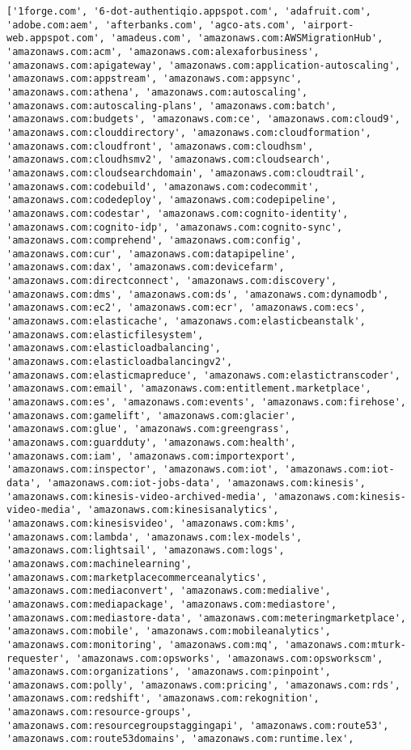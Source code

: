 \documentclass[11pt]{article}
\begin{document}
    \begin{Verbatim}[commandchars=\\\{\}]
['1forge.com', '6-dot-authentiqio.appspot.com', 'adafruit.com', 'adobe.com:aem', 'afterbanks.com', 'agco-ats.com', 'airport-web.appspot.com', 'amadeus.com', 'amazonaws.com:AWSMigrationHub', 'amazonaws.com:acm', 'amazonaws.com:alexaforbusiness', 'amazonaws.com:apigateway', 'amazonaws.com:application-autoscaling', 'amazonaws.com:appstream', 'amazonaws.com:appsync', 'amazonaws.com:athena', 'amazonaws.com:autoscaling', 'amazonaws.com:autoscaling-plans', 'amazonaws.com:batch', 'amazonaws.com:budgets', 'amazonaws.com:ce', 'amazonaws.com:cloud9', 'amazonaws.com:clouddirectory', 'amazonaws.com:cloudformation', 'amazonaws.com:cloudfront', 'amazonaws.com:cloudhsm', 'amazonaws.com:cloudhsmv2', 'amazonaws.com:cloudsearch', 'amazonaws.com:cloudsearchdomain', 'amazonaws.com:cloudtrail', 'amazonaws.com:codebuild', 'amazonaws.com:codecommit', 'amazonaws.com:codedeploy', 'amazonaws.com:codepipeline', 'amazonaws.com:codestar', 'amazonaws.com:cognito-identity', 'amazonaws.com:cognito-idp', 'amazonaws.com:cognito-sync', 'amazonaws.com:comprehend', 'amazonaws.com:config', 'amazonaws.com:cur', 'amazonaws.com:datapipeline', 'amazonaws.com:dax', 'amazonaws.com:devicefarm', 'amazonaws.com:directconnect', 'amazonaws.com:discovery', 'amazonaws.com:dms', 'amazonaws.com:ds', 'amazonaws.com:dynamodb', 'amazonaws.com:ec2', 'amazonaws.com:ecr', 'amazonaws.com:ecs', 'amazonaws.com:elasticache', 'amazonaws.com:elasticbeanstalk', 'amazonaws.com:elasticfilesystem', 'amazonaws.com:elasticloadbalancing', 'amazonaws.com:elasticloadbalancingv2', 'amazonaws.com:elasticmapreduce', 'amazonaws.com:elastictranscoder', 'amazonaws.com:email', 'amazonaws.com:entitlement.marketplace', 'amazonaws.com:es', 'amazonaws.com:events', 'amazonaws.com:firehose', 'amazonaws.com:gamelift', 'amazonaws.com:glacier', 'amazonaws.com:glue', 'amazonaws.com:greengrass', 'amazonaws.com:guardduty', 'amazonaws.com:health', 'amazonaws.com:iam', 'amazonaws.com:importexport', 'amazonaws.com:inspector', 'amazonaws.com:iot', 'amazonaws.com:iot-data', 'amazonaws.com:iot-jobs-data', 'amazonaws.com:kinesis', 'amazonaws.com:kinesis-video-archived-media', 'amazonaws.com:kinesis-video-media', 'amazonaws.com:kinesisanalytics', 'amazonaws.com:kinesisvideo', 'amazonaws.com:kms', 'amazonaws.com:lambda', 'amazonaws.com:lex-models', 'amazonaws.com:lightsail', 'amazonaws.com:logs', 'amazonaws.com:machinelearning', 'amazonaws.com:marketplacecommerceanalytics', 'amazonaws.com:mediaconvert', 'amazonaws.com:medialive', 'amazonaws.com:mediapackage', 'amazonaws.com:mediastore', 'amazonaws.com:mediastore-data', 'amazonaws.com:meteringmarketplace', 'amazonaws.com:mobile', 'amazonaws.com:mobileanalytics', 'amazonaws.com:monitoring', 'amazonaws.com:mq', 'amazonaws.com:mturk-requester', 'amazonaws.com:opsworks', 'amazonaws.com:opsworkscm', 'amazonaws.com:organizations', 'amazonaws.com:pinpoint', 'amazonaws.com:polly', 'amazonaws.com:pricing', 'amazonaws.com:rds', 'amazonaws.com:redshift', 'amazonaws.com:rekognition', 'amazonaws.com:resource-groups', 'amazonaws.com:resourcegroupstaggingapi', 'amazonaws.com:route53', 'amazonaws.com:route53domains', 'amazonaws.com:runtime.lex', 
\end{Verbatim}
\end{document}
